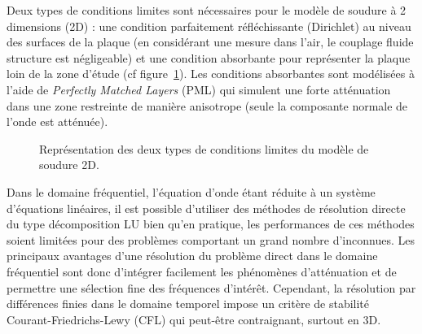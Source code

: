 Deux types de conditions limites sont nécessaires pour le modèle de soudure à 2 dimensions (2D) : une condition parfaitement réfléchissante (Dirichlet) au niveau des surfaces de la plaque (en considérant une mesure dans l'air, le couplage fluide structure est négligeable) et une condition absorbante pour représenter la plaque loin de la zone d'étude (cf figure~\ref{BC}). Les conditions absorbantes sont modélisées à l'aide de \emph{Perfectly Matched Layers} (PML) qui simulent une forte atténuation dans une zone restreinte de manière anisotrope (seule la composante normale de l'onde est atténuée).

\begin{figure}[!h]
	\centering
	\caption{Représentation des deux types de conditions limites du modèle de soudure 2D.\label{BC}}
\end{figure}


Dans le domaine fréquentiel, l'équation d'onde étant réduite à un système d'équations linéaires, il est possible d'utiliser des méthodes de résolution directe du type décomposition LU bien qu'en pratique, les performances de ces méthodes soient limitées pour des problèmes comportant un grand nombre d'inconnues.  Les principaux avantages d'une résolution du problème direct dans le domaine fréquentiel sont donc d'intégrer facilement les phénomènes d'atténuation et de permettre une sélection fine des fréquences d'intérêt. Cependant, la résolution par différences finies dans le domaine temporel impose un critère de stabilité Courant-Friedrichs-Lewy (CFL) qui peut-être contraignant, surtout en 3D.





